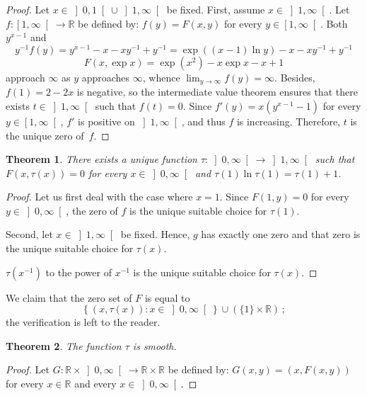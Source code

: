 \documentclass[12pt]{article}
\newcommand{\bR}{\mathbb{R}}
\newcommand{\gtint}[1]{\left] #1, \infty \right[}
\newcommand{\geint}[1]{\left[ #1, \infty \right[}
\newcommand{\leint}[1]{\left]- \infty, #1 \right]}
\newtheorem{theorem}{Theorem}
\begin{document}
\begin{proof}
  Let $x \in \left]0, 1\right[ \cup \gtint{1}$ be fixed.
  First, assume $x \in \gtint{1}$.
  Let $f \colon \geint{1} \to \bR$ be defined by:
  $f(y) = F(x, y)$ for every $y \in \geint{1}$.
  Both
  $y^{x - 1}$ and
  $$
  y^{-1} f(y) = y^{x - 1} - x - x y^{-1} + y^{-1} = \exp \left( (x - 1) \ln y \right) - x - x y^{-1} + y^{- 1}
  $$
  $$
  F(x, \exp x) = \exp( x^2) - x \exp x - x + 1  
  $$
  approach $\infty$
  as $y$ approaches $\infty$,
  whence $\lim_{y \to \infty} f(y) = \infty$.
  Besides, $f(1) = 2 - 2x$ is negative,
  so the intermediate value theorem ensures that there exists $t \in \gtint{1}$ such that $f(t) = 0$.
  Since 
  $f'(y) = x (y^{x - 1} - 1)$ for every $y \in \geint{1}$,
  $f'$ is positive on $\gtint{1}$,
  and thus $f$ is increasing.
  Therefore, $t$ is the unique zero of~$f$.
\end{proof}

\begin{theorem}
  There exists a unique function $\tau \colon \gtint{0} \to \gtint{1}$ such that
  $F(x, \tau(x)) = 0$ for every $x \in \gtint{0}$ and $\tau(1) \ln \tau(1) = \tau(1) + 1$.
\end{theorem}

\begin{proof}
  Let us first deal with the case where $x = 1$.
  Since $F(1, y) = 0$ for every $y \in \gtint{0}$,
  the zero of $f$ is the unique suitable choice for $\tau(1)$.

  Second, let $x \in \gtint{1}$ be fixed.
  Hence, $g$ has exactly one zero and that zero is the unique suitable choice for $\tau(x)$.

   $\tau(x^{-1})$ to the power of $x^{-1}$ is the unique suitable choice for $\tau(x)$.
\end{proof} 

We claim that the zero set of $F$ is equal to
$$
\left\{ (x, \tau(x)) : x \in \gtint{0} \right\} \cup (\{ 1 \} \times \bR)  \,;
$$
the verification is left to the reader.

\begin{theorem}
  The function $\tau$ is smooth.
\end{theorem}

\begin{proof}
  Let $G \colon \bR \times \gtint{0} \to \bR \times \bR$ be defined by:
  $G(x, y) = (x, F(x, y))$ for every $x \in \bR$ and every $x \in \gtint{0}$. 
\end{proof}
\end{document}
